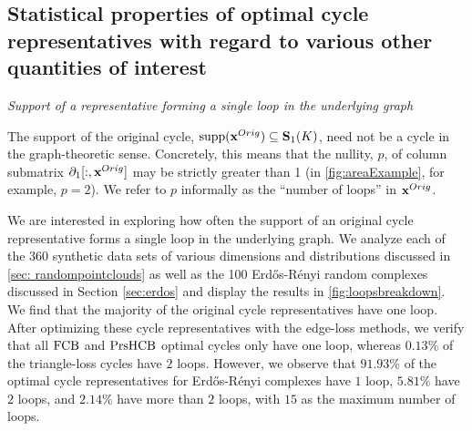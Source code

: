 \subsection{Statistical properties of optimal cycle representatives with regard to various other quantities of interest}



\noindent \emph{Support of a representative forming a single loop in the underlying graph}

The support of the original cycle, $\mathrm{supp}(\mathbf{x}^{Orig}) \subseteq \mathbf{S}_1(K)$, need not be a cycle in the graph-theoretic sense.  Concretely, this means that the nullity, $p$, of column submatrix $\partial_1[:,\mathbf{x}^{Orig}]$ may be strictly greater than 1 (in \fig \ref{fig:areaExample}, for example, $p=2$).  We refer to $p$ informally as the ``number of loops'' in $\mathbf{x}^{Orig}$. 


We are interested in exploring how often the support of an original cycle representative forms a single loop in the underlying graph. We analyze each of the 360 synthetic data sets of various dimensions and distributions discussed in \se \ref{sec: randompointclouds} as well as the 100 Erd\H{o}s-R\'enyi random complexes discussed in Section \ref{sec:erdos} and display the results in \fig \ref{fig:loopsbreakdown}. We find that the majority of the original cycle representatives have one loop. %
After optimizing these cycle representatives with the edge-loss methods, we verify that all $\mathrm{FCB}$ and $\mathrm{PrsHCB}$ optimal cycles only have one loop, whereas $0.13\%$ of the triangle-loss cycles have $2$ loops. However, we observe that $91.93\%$ of the optimal cycle representatives for Erd\H{o}s-R\'enyi complexes have $1$ loop, $5.81\%$ have $2$ loops, and $2.14\%$ have more than $2$ loops, with $15$ as the maximum number of loops. 

